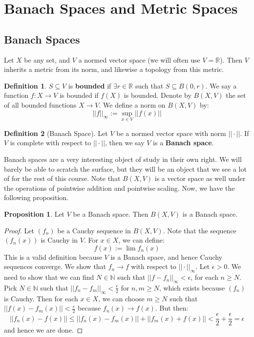 \documentclass[11pt, oneside]{amsart}   	%
\theoremstyle{definition}
\newtheorem{definition}{Definition}[section]
\newtheorem{prop}{Proposition}[section]
\begin{document}
\newpage

\section{Banach Spaces and Metric Spaces}

\subsection{Banach Spaces}

	Let $X$ be any set, and $V$ a normed vector space (we will often use $V = \mathbb R$). Then $V$ inherits a metric from 
	its norm, and likewise a topology from this metric. 
	
	\begin{definition}
		$S\subseteq V$ is \textbf{bounded} if $\exists r\in\mathbb R$ such that $S\subseteq B(0, r)$. We say a function 
		$f : X\rightarrow V$ is bounded if $f(X)$ is bounded. Denote by $B(X, V)$ the set of all bounded functions 
		$X\rightarrow V$. We define a norm on $B(X, V)$ by:
		$$
			||f||_\infty := \sup_{x\in V} ||f(x)||
		$$
	\end{definition}
	
	\begin{definition}[Banach Space]
		Let $V$ be a normed vector space with norm $||\cdot||$. If $V$ is complete with respect to $||\cdot||$, then we say 
		$V$ is a \textbf{Banach space}.
	\end{definition}
	
	Banach spaces are a very interesting object of study in their own right. We will barely be able to scratch the surface, 
	but they will be an object that we see a lot of for the rest of this course. Note that $B(X, V)$ is a vector space as 
	well under the operations of pointwise addition and pointwise scaling. Now, we have the following proposition.
	
	\begin{prop}
		Let $V$ be a Banach space. Then $B(X, V)$ is a Banach space. 
	\end{prop}
	
	\begin{proof}
		Let $(f_n)$ be a Cauchy sequence in $B(X, V)$. Note that the sequence $(f_n(x))$ is Cauchy in $V$. For $x\in X$, 
		we can define:
		$$
			f(x) := \lim f_n(x)
		$$
		This is a valid definition because $V$ is a Banach space, and hence Cauchy sequences converge. We show that 
		$f_n\rightarrow f$ with respect to $||\cdot||_\infty$. Let $\epsilon > 0$. We need to show that we can find $N\in
		\mathbb N$ such that $||f - f_n||_\infty < \epsilon$, for each $n \geq N$. Pick $N\in\mathbb N$ such that 
		$||f_n - f_m||_\infty < \frac{\epsilon}{2}$ for $n, m\geq N$, which exists because $(f_n)$ is Cauchy. Then for 
		each $x\in X$, we can choose $m \geq N$ such that $||f(x) - f_m(x)|| < \frac{\epsilon}{2}$ because $f_n(x)
		\rightarrow f(x)$. But then:
		$$
			||f_n(x) - f(x)||\leq ||f_n(x) - f_m(x)|| + ||f_m(x) + f(x)|| < \frac{\epsilon}{2} + \frac{\epsilon}{2} = \epsilon
		$$
		and hence we are done.
	\end{proof}
	
\end{document}
